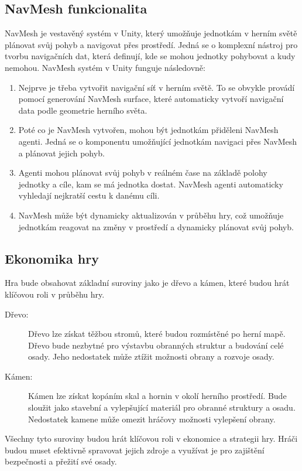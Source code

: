 \subsection{NavMesh funkcionalita}
\label{NavMesh}
NavMesh je vestavěný systém v Unity, který umožňuje jednotkám v herním světě plánovat svůj pohyb a navigovat přes prostředí. Jedná se o komplexní nástroj pro tvorbu navigačních dat, která definují, kde se mohou jednotky pohybovat a kudy nemohou. NavMesh systém v Unity funguje následovně:

\begin{enumerate}
	\item Nejprve je třeba vytvořit navigační síť v herním světě. To se obvykle provádí pomocí generování NavMesh surface, které automaticky vytvoří navigační data podle geometrie herního světa.
	\item Poté co je NavMesh vytvořen, mohou být jednotkám přiděleni NavMesh agenti. Jedná se o komponentu umožňující jednotkám navigaci přes NavMesh a plánovat jejich pohyb.
	\item Agenti mohou plánovat svůj pohyb v reálném čase na základě polohy jednotky a cíle, kam se má jednotka dostat. NavMesh agenti automaticky vyhledají nejkratší cestu k danému cíli.
	\item NavMesh může být dynamicky aktualizován v průběhu hry, což umožňuje jednotkám reagovat na změny v prostředí a dynamicky plánovat svůj pohyb.
\end{enumerate}

\subsection{Ekonomika hry}
Hra bude obsahovat základní suroviny jako je dřevo a kámen, které budou hrát klíčovou roli v průběhu hry.

\begin{description}
	\item[Dřevo:] Dřevo lze získat těžbou stromů, které budou rozmístěné po herní mapě. Dřevo bude nezbytné pro výstavbu obranných struktur a budování celé osady. Jeho nedostatek může ztížit možnosti obrany a rozvoje osady.
	\item[Kámen:] Kámen lze získat kopáním skal a hornin v okolí herního prostředí. Bude sloužit jako stavební a vylepšující materiál pro obranné struktury a osadu. Nedostatek kamene může omezit hráčovy možnosti vylepšení obrany.
\end{description}

Všechny tyto suroviny budou hrát klíčovou roli v ekonomice a strategii hry. Hráči budou muset efektivně spravovat jejich zdroje a využívat je pro zajištění bezpečnosti a přežití své osady.

